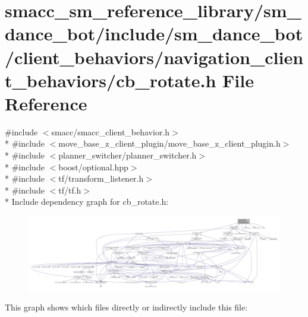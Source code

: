 \hypertarget{smacc__sm__reference__library_2sm__dance__bot_2include_2sm__dance__bot_2client__behaviors_2navig3aeb16fc2e34fbea7ed02f592cb2b9a4}{}\section{smacc\+\_\+sm\+\_\+reference\+\_\+library/sm\+\_\+dance\+\_\+bot/include/sm\+\_\+dance\+\_\+bot/client\+\_\+behaviors/navigation\+\_\+client\+\_\+behaviors/cb\+\_\+rotate.h File Reference}
\label{smacc__sm__reference__library_2sm__dance__bot_2include_2sm__dance__bot_2client__behaviors_2navig3aeb16fc2e34fbea7ed02f592cb2b9a4}
{\ttfamily \#include $<$smacc/smacc\+\_\+client\+\_\+behavior.\+h$>$}\\*
{\ttfamily \#include $<$move\+\_\+base\+\_\+z\+\_\+client\+\_\+plugin/move\+\_\+base\+\_\+z\+\_\+client\+\_\+plugin.\+h$>$}\\*
{\ttfamily \#include $<$planner\+\_\+switcher/planner\+\_\+switcher.\+h$>$}\\*
{\ttfamily \#include $<$boost/optional.\+hpp$>$}\\*
{\ttfamily \#include $<$tf/transform\+\_\+listener.\+h$>$}\\*
{\ttfamily \#include $<$tf/tf.\+h$>$}\\*
Include dependency graph for cb\+\_\+rotate.\+h\+:
\nopagebreak
\begin{figure}[H]
\begin{center}
\leavevmode
\includegraphics[width=350pt]{smacc__sm__reference__library_2sm__dance__bot_2include_2sm__dance__bot_2client__behaviors_2navig120e2f8022472ae57f58bd2e3243554e}
\end{center}
\end{figure}
This graph shows which files directly or indirectly include this file\+:
\nopagebreak
